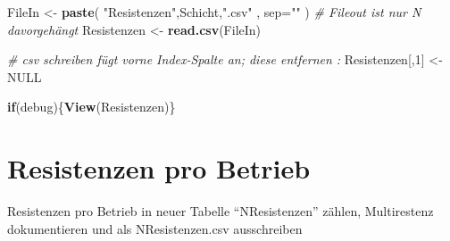 \documentclass[
]{article}
\newenvironment{Shaded}{\begin{snugshade}}{\end{snugshade}}
\newcommand{\CommentTok}[1]{\textcolor[rgb]{0.56,0.35,0.01}{\textit{#1}}}
\newcommand{\ControlFlowTok}[1]{\textcolor[rgb]{0.13,0.29,0.53}{\textbf{#1}}}
\newcommand{\DataTypeTok}[1]{\textcolor[rgb]{0.13,0.29,0.53}{#1}}
\newcommand{\DecValTok}[1]{\textcolor[rgb]{0.00,0.00,0.81}{#1}}
\newcommand{\KeywordTok}[1]{\textcolor[rgb]{0.13,0.29,0.53}{\textbf{#1}}}
\newcommand{\NormalTok}[1]{#1}
\newcommand{\OtherTok}[1]{\textcolor[rgb]{0.56,0.35,0.01}{#1}}
\newcommand{\StringTok}[1]{\textcolor[rgb]{0.31,0.60,0.02}{#1}}
\begin{document}
\begin{Shaded}
\begin{Highlighting}[]
\NormalTok{FileIn <-}\StringTok{ }\KeywordTok{paste}\NormalTok{( }\StringTok{"Resistenzen"}\NormalTok{,Schicht,}\StringTok{".csv"}\NormalTok{ , }\DataTypeTok{sep=}\StringTok{""}\NormalTok{ )  }\CommentTok{# Fileout ist nur N davorgehängt}
\NormalTok{Resistenzen <-}\StringTok{ }\KeywordTok{read.csv}\NormalTok{(FileIn)}

\CommentTok{# csv schreiben fügt vorne Index-Spalte an; diese entfernen :}
\NormalTok{Resistenzen[,}\DecValTok{1}\NormalTok{] <-}\StringTok{ }\OtherTok{NULL}                      

\ControlFlowTok{if}\NormalTok{(debug)\{}\KeywordTok{View}\NormalTok{(Resistenzen)\}}
\end{Highlighting}
\end{Shaded}

\hypertarget{resistenzen-pro-betrieb}{%
\section{Resistenzen pro Betrieb}\label{resistenzen-pro-betrieb}}

Resistenzen pro Betrieb in neuer Tabelle ``NResistenzen'' zählen,
Multirestenz dokumentieren und als NResistenzen.csv ausschreiben
\end{document}
